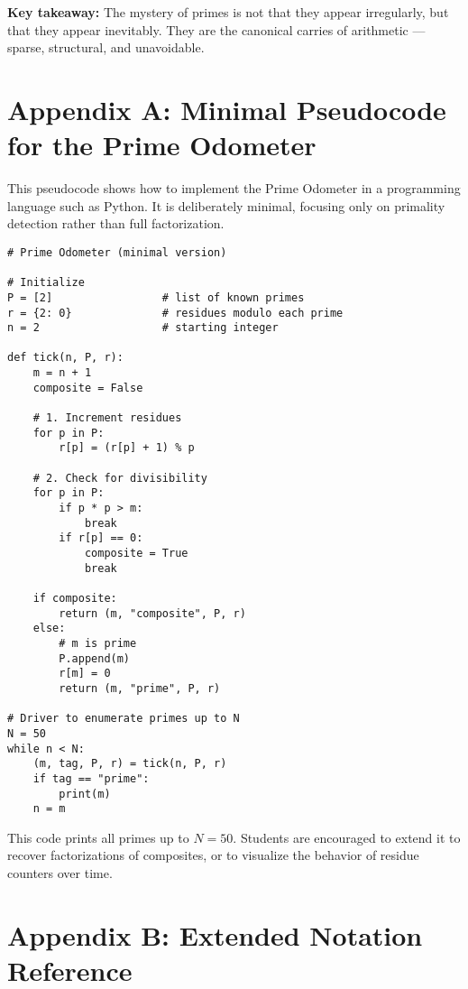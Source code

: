 \documentclass[11pt]{article}
\theoremstyle{definition}
\begin{document}
\begin{studentnote}
\textbf{Key takeaway:}  
The mystery of primes is not that they appear irregularly, 
but that they appear inevitably.  
They are the canonical carries of arithmetic --- sparse, structural, 
and unavoidable.  
\end{studentnote}

\appendix

\section*{Appendix A: Minimal Pseudocode for the Prime Odometer}

This pseudocode shows how to implement the Prime Odometer in a programming language 
such as Python. It is deliberately minimal, focusing only on primality detection 
rather than full factorization.

\begin{verbatim}
# Prime Odometer (minimal version)

# Initialize
P = [2]                 # list of known primes
r = {2: 0}              # residues modulo each prime
n = 2                   # starting integer

def tick(n, P, r):
    m = n + 1
    composite = False

    # 1. Increment residues
    for p in P:
        r[p] = (r[p] + 1) % p

    # 2. Check for divisibility
    for p in P:
        if p * p > m: 
            break
        if r[p] == 0:
            composite = True
            break

    if composite:
        return (m, "composite", P, r)
    else:
        # m is prime
        P.append(m)
        r[m] = 0
        return (m, "prime", P, r)

# Driver to enumerate primes up to N
N = 50
while n < N:
    (m, tag, P, r) = tick(n, P, r)
    if tag == "prime":
        print(m)
    n = m
\end{verbatim}

\begin{studentnote}
This code prints all primes up to $N=50$.  
Students are encouraged to extend it to recover factorizations of composites, 
or to visualize the behavior of residue counters over time.  
\end{studentnote}

\section*{Appendix B: Extended Notation Reference}
\end{document}

